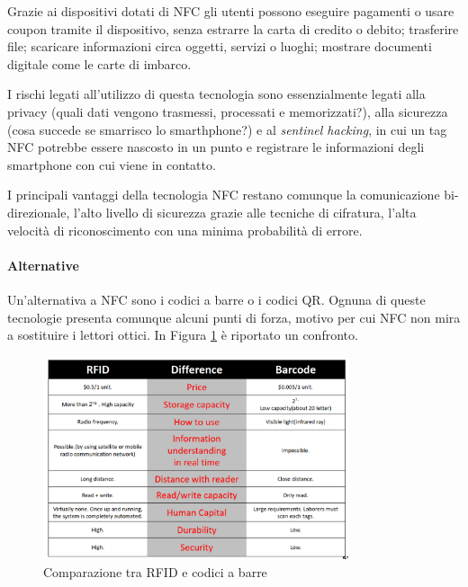 	Grazie ai dispositivi dotati di NFC gli utenti possono
	eseguire pagamenti o usare coupon tramite il dispositivo, senza estrarre la carta di credito o debito;
	trasferire file;
	scaricare informazioni circa oggetti, servizi o luoghi;
	mostrare documenti digitale come le carte di imbarco.
	
	I rischi legati all'utilizzo di questa tecnologia sono essenzialmente legati
	alla privacy (quali dati vengono trasmessi, processati e memorizzati?),
	alla sicurezza (cosa succede se smarrisco lo smarthphone?)
	e al \emph{sentinel hacking}, in cui un tag NFC potrebbe essere nascosto in un punto e registrare le informazioni degli smartphone con cui viene in contatto.
	
	I principali vantaggi della tecnologia NFC restano comunque la comunicazione bi-direzionale, l'alto livello di sicurezza grazie alle tecniche di cifratura, l'alta velocità di riconoscimento con una minima probabilità di errore.
	
	\paragraph{Alternative}
	Un'alternativa a NFC sono i codici a barre o i codici QR.
	Ognuna di queste tecnologie presenta comunque alcuni punti di forza, motivo per cui NFC non mira a sostituire i lettori ottici.
	In Figura \ref{fig:comparazioneRFID-barcode} è riportato un confronto.
	
	\begin{figure}
		\centering
		\includegraphics[width=0.8\textwidth]{lez7/tabellaComparativaRFID-barcode.png}
		\caption{Comparazione tra RFID e codici a barre}
		\label{fig:comparazioneRFID-barcode}
	\end{figure}
